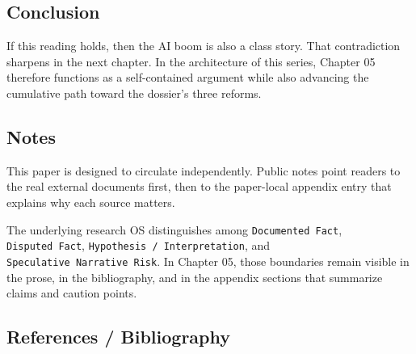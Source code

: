 \documentclass[
  american,
  11pt,
  letterpaper,
]{article}
\begin{document}
\subsection{Conclusion}\label{conclusion-5}

If this reading holds, then the AI boom is also a class story. That
contradiction sharpens in the next chapter. In the architecture of this
series, Chapter 05 therefore functions as a self-contained argument
while also advancing the cumulative path toward the dossier's three
reforms.

\subsection{Notes}\label{notes-5}

This paper is designed to circulate independently. Public notes point
readers to the real external documents first, then to the paper-local
appendix entry that explains why each source matters.

The underlying research OS distinguishes among
\texttt{Documented\ Fact}, \texttt{Disputed\ Fact},
\texttt{Hypothesis\ /\ Interpretation}, and
\texttt{Speculative\ Narrative\ Risk}. In Chapter 05, those boundaries
remain visible in the prose, in the bibliography, and in the appendix
sections that summarize claims and caution points.

\subsection{References / Bibliography}\label{references-bibliography-5}
\end{document}
